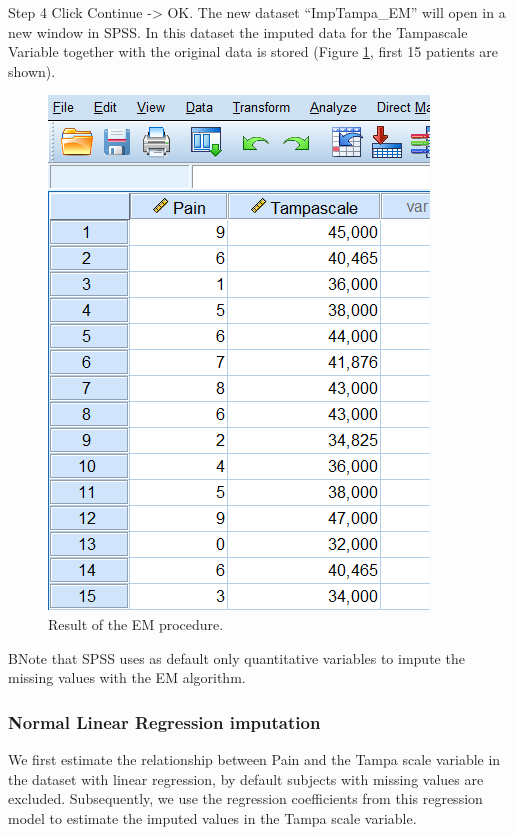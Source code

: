 \documentclass[
]{book}
\begin{document}
Step 4
Click Continue -\textgreater{} OK. The new dataset ``ImpTampa\_EM'' will open in a new window in SPSS. In this dataset the imputed data for the Tampascale Variable together with the original data is stored (Figure \ref{fig:fig3-13}, first 15 patients are shown).

\begin{figure}

{\centering \includegraphics[width=0.7\linewidth]{images/fig3.13} 

}

\caption{Result of the EM procedure.}\label{fig:fig3-13}
\end{figure}

BNote that SPSS uses as default only quantitative variables to impute the missing values with the EM algorithm.

\hypertarget{normal-linear-regression-imputation}{%
\subsubsection{Normal Linear Regression imputation}\label{normal-linear-regression-imputation}}

We first estimate the relationship between Pain and the Tampa scale variable in the dataset with linear regression, by default subjects with missing values are excluded. Subsequently, we use the regression coefficients from this regression model to estimate the imputed values in the Tampa scale variable.
\end{document}

